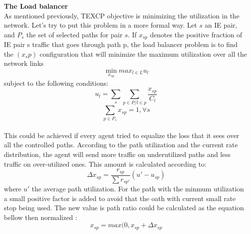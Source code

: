 {\bf The Load balancer}
\\ As mentioned previously, TEXCP objective is minimizing the utilization in the network. Let's try to put this problem in a more formal way. Let $s$ an IE pair, and $P_s$ the set of selected paths for pair $s$. If $x_{sp}$ denotes the positive fraction of IE pair s traffic that goes through path p, the load balancer problem is to find the $(x_sp)$ configuration that will minimize the maximum utilization over all the network links 
\begin{equation}
\min_{x_{sp}} max_{l \in L} u_{l}
\end{equation}
subject to the following conditions:
\begin{equation}
u_l = \sum_{s} \sum_{p \in P / l \in p} \frac {x_{sp} }{C_l}
\end{equation}
\begin{equation}
\sum_{p \in P_{s}} x_{sp} = 1,  \forall s
\end{equation}
\\ This could be achieved if every agent tried to equalize the loss that it sees over all the controlled paths. According to the path utilization and the current rate distribution, the agent will send more traffic on underutilized paths and less traffic on over-utilized ones. This amount is calculated according to:
\begin{equation}
\Delta x_{sp} = \frac{r_{sp}} {\sum r_{sp'}}  (u' - u_{sp}) 
\end{equation}
where $u'$ the average path utilization. For the path with the minmum utilization a small positive factor is added to avoid that the oath with current small rate stop being used. The new value is path ratio could be calculated as the equation bellow then normalized :
\begin{equation}
x_{sp} = max(0, x_{sp} + \Delta x_{sp}
\end{equation}


